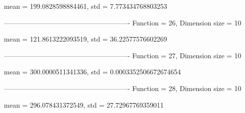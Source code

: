 mean = 199.0828598884461, std = 7.773434768803253

-------------------------------------------------------
Function = 26, Dimension size = 10


mean = 121.8613222093519, std = 36.22577576602269

-------------------------------------------------------
Function = 27, Dimension size = 10


mean = 300.0000511341336, std = 0.0003352506672674654

-------------------------------------------------------
Function = 28, Dimension size = 10


mean = 296.078431372549, std = 27.72967769359011